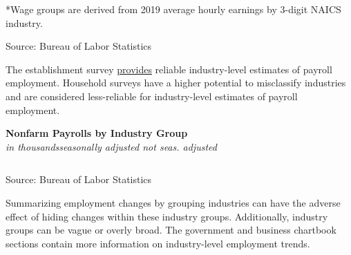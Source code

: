 \documentclass{report}
\newcommand{\tbllink}[1]{\href{https://raw.githubusercontent.com/bdecon/US-chartbook/master/chartbook/data/#1}{\faTable}}
\begin{document}
{\begin{minipage}{1.0\textwidth}
\footnotesize{*Wage groups are derived from 2019 average hourly earnings by 3-digit NAICS industry. }
\vspace*{-1mm}

\footnotesize{Source: Bureau of Labor Statistics} \hfill \tbllink{jobs_tercile.csv}
\end{minipage}
\newpage
\begin{minipage}{1.0\textwidth}    
\small The establishment survey \href{https://www.bls.gov/news.release/empsit.t17.htm}{provides} reliable industry-level estimates of payroll employment. Household surveys have a higher potential to misclassify industries and are considered less-reliable for industry-level estimates of payroll employment.


\end{minipage}
\vspace{2mm}

\begin{minipage}{0.83\textwidth}
\normalsize \textbf{Nonfarm Payrolls by Industry Group}\\
\footnotesize{\textit{in thousands\hspace{35mm}seasonally adjusted \hspace{29mm} not seas. adjusted}}
\vspace{-6mm}

\hspace*{-3mm}  \setlength{\tabcolsep}{3.6pt} \color{black!90}
		{\renewcommand{\arraystretch}{1.55}
		 \begin{tabular}{p{45mm} R{12.8mm} R{10.8mm} R{10.6mm} R{10.6mm} 
		   | R{12.0mm} R{10.6mm}}
			  \hline
		\end{tabular}}
\vspace{-3mm}

\footnotesize{Source: Bureau of Labor Statistics} \hfill \tbllink{ces_data.csv}
\end{minipage}
\vspace{3mm}

\begin{minipage}{1.0\textwidth}
\small Summarizing employment changes by grouping industries can have the adverse effect of hiding changes within these industry groups. Additionally, industry groups can be vague or overly broad. The government and business chartbook sections contain more information on industry-level employment trends. 
\end{minipage}
\newpage
\vspace*{-10mm} \hypertarget{epoplt}{}

}
\end{document}
